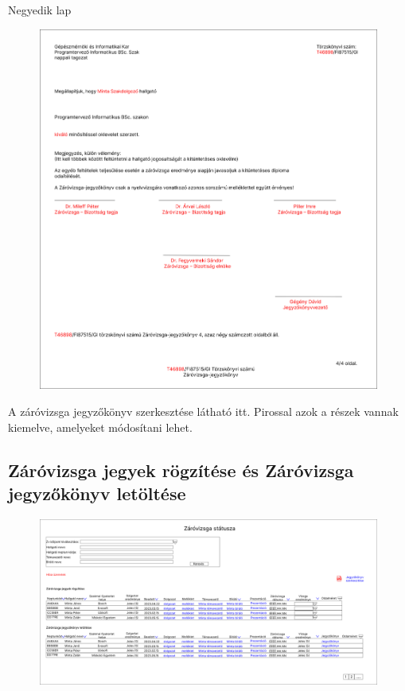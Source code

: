 \documentclass[a4paper,12pt]{article}
\begin{document}
Negyedik lap

\begin{figure}
	\centering
	\includegraphics[width=\textwidth]{images/Web_pages/Zv_Report4.png}
	\caption{}
	\label{fig:Zv_Report4}
\end{figure}

A záróvizsga jegyzőkönyv szerkesztése látható itt. Pirossal azok a részek vannak kiemelve, amelyeket módosítani lehet.

\subsection{Záróvizsga jegyek rögzítése és Záróvizsga jegyzőkönyv letöltése}


\begin{figure}
	\centering
	\includegraphics[width=\textwidth]{images/Web_pages/Zv_Status.png}
	\caption{}
	\label{fig:Zv_Status}
\end{figure}
\end{document}
